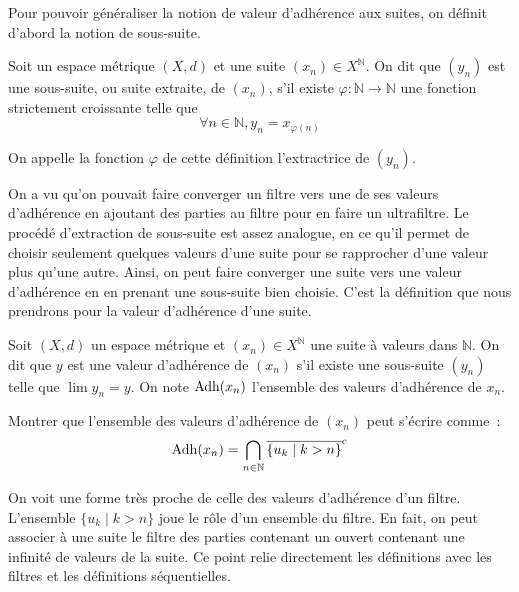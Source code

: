 Pour pouvoir généraliser la notion de valeur d'adhérence aux suites, on définit
d'abord la notion de sous-suite.

\begin{definition}
  Soit un espace métrique $(X,d)$ et une suite $(x_n)\in X^\mathbb N$. On dit
  que $(y_n)$ est une sous-suite, ou suite extraite, de $(x_n)$, s'il existe
  $\varphi : \mathbb N \to \mathbb N$ une fonction strictement croissante
  telle que
  \[\forall n \in \mathbb N, y_n = x_{\varphi(n)}\]

  On appelle la fonction $\varphi$ de cette définition l'extractrice de
  $(y_n)$.
\end{definition}

On a vu qu'on pouvait faire converger un filtre vers une de ses valeurs
d'adhérence en ajoutant des parties au filtre pour en faire un ultrafiltre.
Le procédé d'extraction de sous-suite est assez analogue, en ce qu'il permet
de choisir seulement quelques valeurs d'une suite pour se rapprocher d'une
valeur plus qu'une autre. Ainsi, on peut faire converger une suite vers une
valeur d'adhérence en en prenant une sous-suite bien choisie. C'est la
définition que nous prendrons pour la valeur d'adhérence d'une suite.

\begin{definition}
  Soit $(X,d)$ un espace métrique et $(x_n)\in X^\mathbb N$ une suite à
  valeurs dans $\mathbb N$. On dit que $y$ est une valeur d'adhérence de
  $(x_n)$ s'il existe une sous-suite $(y_n)$ telle que $\lim y_n = y$. On
  note $\operatorname{Adh}(x_n)$ l'ensemble des valeurs d'adhérence de $x_n$.
\end{definition}

\begin{exercise}
  Montrer que l'ensemble des valeurs d'adhérence de $(x_n)$ peut s'écrire
  comme~:
  \[\operatorname{Adh}(x_n) = \bigcap_{n \in \mathbb N} \overline{\{u_k \mid k > n\}}^{\mathrm c}\]
\end{exercise}

\begin{remark}
  On voit une forme très proche de celle des valeurs d'adhérence d'un filtre.
  L'ensemble $\{u_k \mid k > n\}$ joue le rôle d'un ensemble du filtre. En
  fait, on peut associer à une suite le filtre des parties contenant un ouvert
  contenant une infinité de valeurs de la suite. Ce point relie directement
  les définitions avec les filtres et les définitions séquentielles.
\end{remark}

